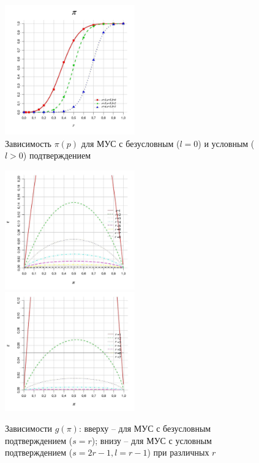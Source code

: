 \begin{figure}[!h]
\begin{center}
\centering
\includegraphics[width=0.5\textwidth]{pic/validation.pdf}
\end{center}
\caption{\label{pic:OpenTimeValidation1} Зависимость $\pi(p)$ для МУС с безусловным ($l=0$) и условным ($l>0$) подтверждением}
\end{figure}

\begin{figure}[!ht]
\begin{center}
\centering
\includegraphics[width=0.5\textwidth]{pic/gFromPiNoConfirm.pdf}
\includegraphics[width=0.5\textwidth]{pic/gFromPiConfirm.pdf}
\end{center}
\caption{\label{pic:g-graph-conf} Зависимости $g(\pi)$: вверху -- для МУС с безусловным подтверждением ($s=r$); внизу -- для МУС с условным подтверждением ($s=2r-1, l=r-1$) при различных $r$}
\end{figure}

